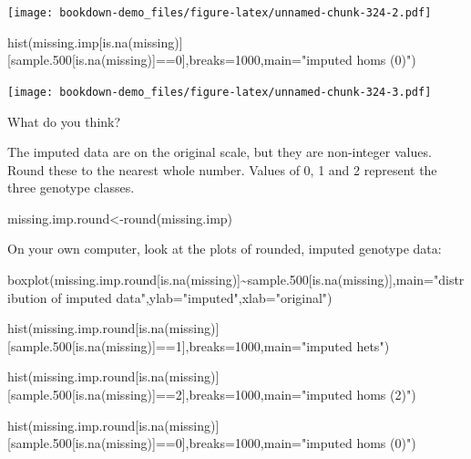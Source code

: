 \documentclass[
]{book}
\newenvironment{Shaded}{\begin{snugshade}}{\end{snugshade}}
\newcommand{\AttributeTok}[1]{\textcolor[rgb]{0.77,0.63,0.00}{#1}}
\newcommand{\DecValTok}[1]{\textcolor[rgb]{0.00,0.00,0.81}{#1}}
\newcommand{\FloatTok}[1]{\textcolor[rgb]{0.00,0.00,0.81}{#1}}
\newcommand{\FunctionTok}[1]{\textcolor[rgb]{0.00,0.00,0.00}{#1}}
\newcommand{\NormalTok}[1]{#1}
\newcommand{\OtherTok}[1]{\textcolor[rgb]{0.56,0.35,0.01}{#1}}
\newcommand{\SpecialCharTok}[1]{\textcolor[rgb]{0.00,0.00,0.00}{#1}}
\newcommand{\StringTok}[1]{\textcolor[rgb]{0.31,0.60,0.02}{#1}}
\begin{document}
\texttt{[image: bookdown-demo\_files/figure-latex/unnamed-chunk-324-2.pdf]}

\begin{Shaded}
\begin{Highlighting}[]
\FunctionTok{hist}\NormalTok{(missing.imp[}\FunctionTok{is.na}\NormalTok{(missing)][sample}\FloatTok{.500}\NormalTok{[}\FunctionTok{is.na}\NormalTok{(missing)]}\SpecialCharTok{==}\DecValTok{0}\NormalTok{],}\AttributeTok{breaks=}\DecValTok{1000}\NormalTok{,}\AttributeTok{main=}\StringTok{"imputed homs (0)"}\NormalTok{) }
\end{Highlighting}
\end{Shaded}

\texttt{[image: bookdown-demo\_files/figure-latex/unnamed-chunk-324-3.pdf]}

What do you think?

The imputed data are on the original scale, but they are non-integer values. Round these to the nearest whole number. Values of 0, 1 and 2 represent the three genotype classes.

\begin{Shaded}
\begin{Highlighting}[]
\NormalTok{missing.imp.round}\OtherTok{\textless{}{-}}\FunctionTok{round}\NormalTok{(missing.imp)}
\end{Highlighting}
\end{Shaded}

On your own computer, look at the plots of rounded, imputed genotype data:

\begin{Shaded}
\begin{Highlighting}[]
\FunctionTok{boxplot}\NormalTok{(missing.imp.round[}\FunctionTok{is.na}\NormalTok{(missing)]}\SpecialCharTok{\textasciitilde{}}\NormalTok{sample}\FloatTok{.500}\NormalTok{[}\FunctionTok{is.na}\NormalTok{(missing)],}\AttributeTok{main=}\StringTok{"distribution of imputed data"}\NormalTok{,}\AttributeTok{ylab=}\StringTok{"imputed"}\NormalTok{,}\AttributeTok{xlab=}\StringTok{"original"}\NormalTok{)}

\FunctionTok{hist}\NormalTok{(missing.imp.round[}\FunctionTok{is.na}\NormalTok{(missing)][sample}\FloatTok{.500}\NormalTok{[}\FunctionTok{is.na}\NormalTok{(missing)]}\SpecialCharTok{==}\DecValTok{1}\NormalTok{],}\AttributeTok{breaks=}\DecValTok{1000}\NormalTok{,}\AttributeTok{main=}\StringTok{"imputed hets"}\NormalTok{)}

\FunctionTok{hist}\NormalTok{(missing.imp.round[}\FunctionTok{is.na}\NormalTok{(missing)][sample}\FloatTok{.500}\NormalTok{[}\FunctionTok{is.na}\NormalTok{(missing)]}\SpecialCharTok{==}\DecValTok{2}\NormalTok{],}\AttributeTok{breaks=}\DecValTok{1000}\NormalTok{,}\AttributeTok{main=}\StringTok{"imputed homs (2)"}\NormalTok{)}

\FunctionTok{hist}\NormalTok{(missing.imp.round[}\FunctionTok{is.na}\NormalTok{(missing)][sample}\FloatTok{.500}\NormalTok{[}\FunctionTok{is.na}\NormalTok{(missing)]}\SpecialCharTok{==}\DecValTok{0}\NormalTok{],}\AttributeTok{breaks=}\DecValTok{1000}\NormalTok{,}\AttributeTok{main=}\StringTok{"imputed homs (0)"}\NormalTok{) }
\end{Highlighting}
\end{Shaded}
\end{document}
